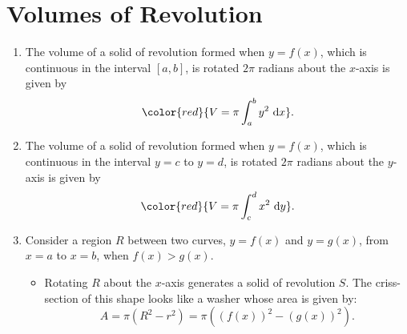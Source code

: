 \documentclass[12pt, a4paper]{article}
\def\d{{\mathrm{d}}}
\begin{document}
\section{Volumes of Revolution}
\begin{enumerate}
    \item The volume of a solid of revolution formed when $y=f(x)$, which is continuous in the interval $\left[a,b\right]$, is rotated $2\pi$ radians about the $x$-axis is given by 
    $${\color{red}{V=\pi\int_a^by^2\ \d x}}.$$
    \item The volume of a solid of revolution formed when $y=f(x)$, which is continuous in the interval $y=c$ to $y=d$, is rotated $2\pi$ radians about the $y$-axis is given by
    $${\color{red}{V=\pi\int_c^dx^2\ \d y}}.$$
    \item Consider a region $R$ between two curves, $y=f(x)$ and $y=g(x)$, from $x=a$ to $x=b$, when $f(x)>g(x)$.
    \begin{figure}[htbp]
        \centering
    \end{figure}
    \begin{itemize}
        \item Rotating $R$ about the $x$-axis generates a solid of revolution $S$. 
        The criss-section of this shape looks like a washer whose area is given by: $$A=\pi(R^2-r^2)=\pi\left(\left(f(x)\right)^2-\left(g(x)\right)^2\right).$$

\end{itemize}
\end{enumerate}
\end{document}
